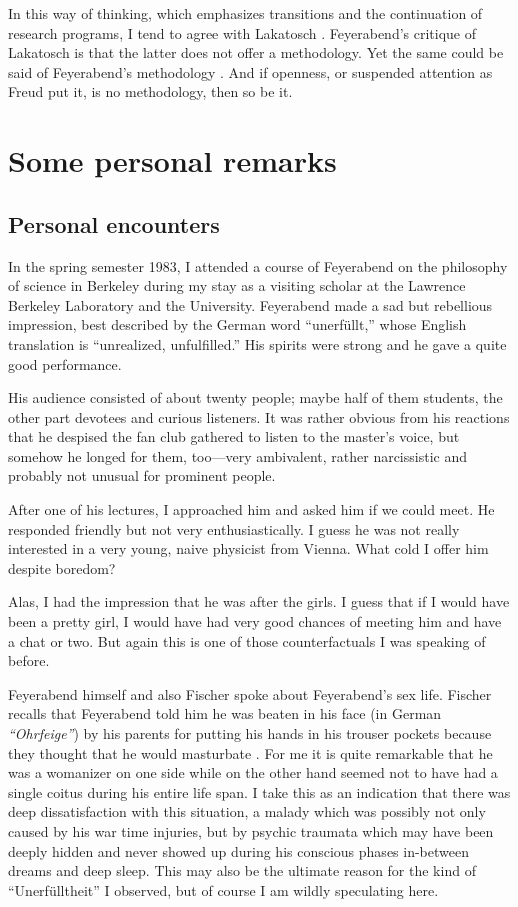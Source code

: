 \documentclass{article}
\begin{document}
In this way of thinking, which emphasizes transitions and the continuation of research programs,
I tend to agree with Lakatosch \cite{lakatosch}.
Feyerabend's critique of Lakatosch is that the latter does not offer a methodology.
Yet the same could be said of Feyerabend's methodology
\cite{feyerabend-defense,feyer-81}.
And if openness, or suspended attention as Freud put it, is no methodology, then so be it.



\section{Some personal remarks}

\subsection{Personal encounters}
In the spring semester 1983, I  attended a course of Feyerabend on the philosophy
of science in Berkeley during my stay as a visiting scholar at the Lawrence Berkeley
Laboratory and the University.
Feyerabend made a sad but rebellious impression,
best described by the German word ``unerf\"ullt,'' whose English translation
is ``unrealized, unfulfilled.''
His spirits were strong and he gave a quite good performance.

His audience consisted of about twenty people; maybe half of them students,
the other part devotees and curious listeners.
It was rather obvious from his reactions that he despised the fan club gathered
to listen to the master's voice, but somehow he longed for them, too---very ambivalent,
rather narcissistic
and probably not unusual for prominent people.

After one of his lectures, I approached him and asked him if we could meet.
He responded friendly but not very enthusiastically.
I guess he was not really interested in a very young, naive physicist from Vienna.
What cold I offer him despite boredom?

Alas, I had the impression that he was after the girls.
I guess that if I would have been a pretty girl,
I would have had very good chances of meeting him and have a chat or two.
But again this is one of those counterfactuals I was speaking of before.

Feyerabend himself
\cite{feyerabend-auto}
and also
Fischer \cite{fischer}
spoke about Feyerabend's sex life.
Fischer recalls that Feyerabend told him he was beaten in his face (in German {\em ``Ohrfeige''})
by his parents for putting his hands in his trouser pockets
because they thought that he would masturbate \cite{fischer-04}.
For me it is quite remarkable that he was a womanizer on one side
while on the other hand seemed not to have had a single coitus during his entire life span.
I take this as an indication that there was deep dissatisfaction with this situation,
a malady which was possibly not only caused by his war time injuries,
but by psychic traumata which may have been deeply hidden and never showed up during
his conscious phases in-between dreams and deep sleep.
This may also be the ultimate reason for the kind of ``Unerf\"ulltheit''
I observed, but of course I am wildly speculating here.
\end{document}
